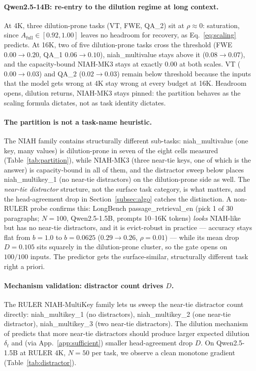 \documentclass{article}
\begin{document}
\paragraph{Qwen2.5-14B: re-entry to the dilution regime at long
context.} At 4K, three dilution-prone tasks (VT, FWE, QA\_2) sit at
$\rho \approx 0$: saturation, since $A_{\mathrm{full}} \in [0.92,
1.00]$ leaves no headroom for recovery, as Eq.~\eqref{eq:scaling}
predicts. At 16K, two of five dilution-prone tasks cross the
threshold (FWE $0.00 \to 0.20$, QA\_1 $0.06 \to 0.10$),
niah\_multivalue stays above it ($0.08 \to 0.07$), and the capacity-bound
NIAH-MK3 stays at exactly $0.00$ at both scales. VT ($0.00 \to 0.03$) and QA\_2
($0.02 \to 0.03$) remain below threshold because the inputs that the
model gets wrong at 4K stay wrong at every budget at 16K. Headroom
opens, dilution returns, NIAH-MK3 stays pinned: the partition behaves
as the scaling formula dictates, not as task identity dictates.

\paragraph{The partition is not a task-name heuristic.} The NIAH family contains
structurally different sub-tasks: niah\_multivalue (one key, many values) is
dilution-prone in seven of the eight cells measured (Table~\ref{tab:partition}), while
NIAH-MK3 (three near-tie keys, one of which is the answer) is capacity-bound in
all of them, and the distractor sweep below places niah\_multikey\_1 (no
near-tie distractors) on the dilution-prone side as well. The
\emph{near-tie distractor} structure, not the surface task category, is what
matters, and the head-agreement drop in Section~\ref{subsec:algo} catches the
distinction. A non-RULER probe confirms this: LongBench
passage\_retrieval\_en (pick 1 of 30 paragraphs; $N = 100$,
Qwen2.5-1.5B, prompts 10--16K tokens) \emph{looks} NIAH-like but has no
near-tie distractors, and it is evict-robust in practice --- accuracy
stays flat from $b = 1.0$ to $b = 0.0625$ ($0.29 \to 0.26$, $\rho =
0.01$) --- while its mean drop $D = 0.105$ sits squarely in the
dilution-prone cluster, so the gate opens on $100/100$ inputs. The
predictor gets the surface-similar, structurally different task right
a priori.

\paragraph{Mechanism validation: distractor count drives $D$.} The
RULER NIAH-MultiKey family lets us sweep the near-tie distractor count
directly: niah\_multikey\_1 (no distractors), niah\_multikey\_2 (one
near-tie distractor), niah\_multikey\_3 (two near-tie distractors).
The dilution mechanism of \citet{arxiv260509649} predicts that more
near-tie distractors should produce
larger expected dilution $\delta_t$ and (via App.~\ref{app:sufficient})
smaller head-agreement drop $D$. On Qwen2.5-1.5B at RULER 4K, $N = 50$
per task, we observe a clean monotone gradient (Table~\ref{tab:distractor}).
\end{document}
